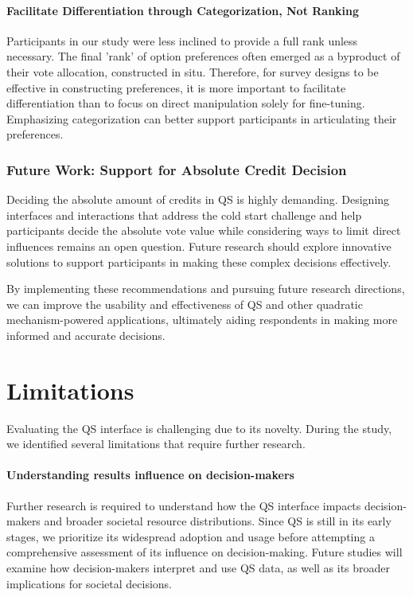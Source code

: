 \paragraph{Facilitate Differentiation through Categorization, Not Ranking}
Participants in our study were less inclined to provide a full rank unless necessary. The final 'rank' of option preferences often emerged as a byproduct of their vote allocation, constructed in situ. Therefore, for survey designs to be effective in constructing preferences, it is more important to facilitate differentiation than to focus on direct manipulation solely for fine-tuning. Emphasizing categorization can better support participants in articulating their preferences.

\subsubsection{Future Work: Support for Absolute Credit Decision}
Deciding the absolute amount of credits in QS is highly demanding. Designing interfaces and interactions that address the cold start challenge and help participants decide the absolute vote value while considering ways to limit direct influences remains an open question. Future research should explore innovative solutions to support participants in making these complex decisions effectively.

By implementing these recommendations and pursuing future research directions, we can improve the usability and effectiveness of QS and other quadratic mechanism-powered applications, ultimately aiding respondents in making more informed and accurate decisions.

\section{Limitations}
\label{sec:limitations}
Evaluating the QS interface is challenging due to its novelty. During the study, we identified several limitations that require further research.

\paragraph{Understanding results influence on decision-makers}
Further research is required to understand how the QS interface impacts decision-makers and broader societal resource distributions. Since QS is still in its early stages, we prioritize its widespread adoption and usage before attempting a comprehensive assessment of its influence on decision-making. Future studies will examine how decision-makers interpret and use QS data, as well as its broader implications for societal decisions.

